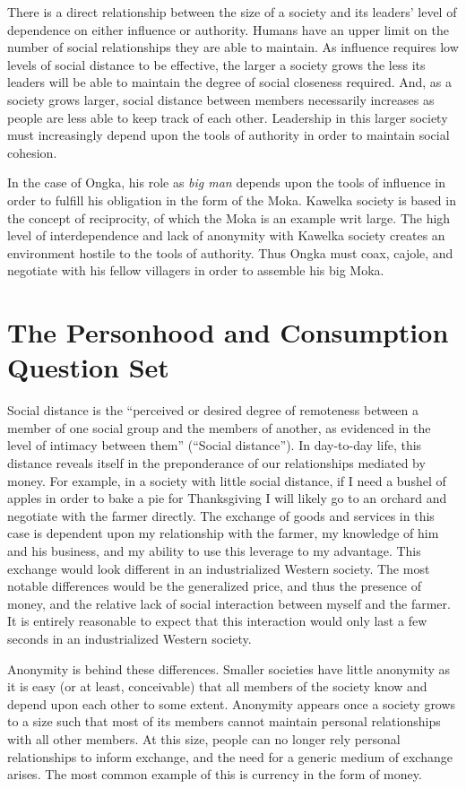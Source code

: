 \documentclass[12pt]{article}
\begin{document}
There is a direct relationship between the size of a society and its leaders'
level of dependence on either influence or authority. Humans have an upper limit
on the number of social relationships they are able to maintain. As influence
requires low levels of social distance to be effective, the larger a society
grows the less its leaders will be able to maintain the degree of social
closeness required. And, as a society grows larger, social distance between
members necessarily increases as people are less able to keep track of each
other. Leadership in this larger society must increasingly depend upon the tools
of authority in order to maintain social cohesion.

In the case of Ongka, his role as \emph{big man} depends upon the tools of influence in
order to fulfill his obligation in the form of the Moka. Kawelka society is
based in the concept of reciprocity, of which the Moka is an example writ large.
The high level of interdependence and lack of anonymity with Kawelka society
creates an environment hostile to the tools of authority. Thus Ongka must
coax, cajole, and negotiate with his fellow villagers in order to assemble his
big Moka.

\newpage{}
\section*{The Personhood and Consumption Question Set}
Social distance is the ``perceived or desired degree of remoteness between a
member of one social group and the members of another, as evidenced in the level
of intimacy between them'' (``Social distance''). In day-to-day life, this
distance reveals itself in the preponderance of our relationships mediated by
money. For example, in a society with little social distance, if I need a bushel
of apples in order to bake a pie for Thanksgiving I will likely go to an orchard
and negotiate with the farmer directly. The exchange of goods and services in
this case is dependent upon my relationship with the farmer, my knowledge of him
and his business, and my ability to use this leverage to my advantage. This
exchange would look different in an industrialized Western society. The most
notable differences would be the generalized price, and thus the presence of
money, and the relative lack of social interaction between myself and the
farmer. It is entirely reasonable to expect that this interaction would only
last a few seconds in an industrialized Western society.

Anonymity is behind these differences. Smaller societies have little anonymity
as it is easy (or at least, conceivable) that all members of the society know
and depend upon each other to some extent. Anonymity appears once a society
grows to a size such that most of its members cannot maintain personal
relationships with all other members. At this size, people can no longer rely
personal relationships to inform exchange, and the need for a generic medium of
exchange arises. The most common example of this is currency in the form of
money.
\end{document}
